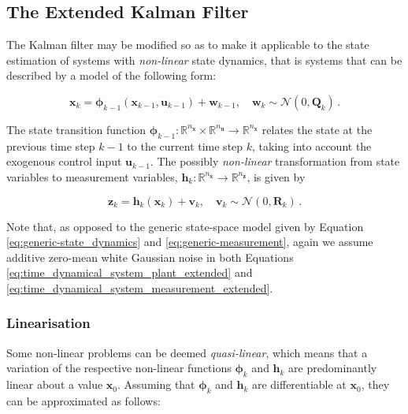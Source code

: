\subsection{The Extended Kalman Filter}\label{sec:extended_kalman}

The Kalman filter may be modified so as to make it applicable to the state estimation of systems with \emph{non-linear} state dynamics, that is systems that can be described by a model of the following form:

\begin{equation}\label{eq:time_dynamical_system_plant_extended}
  \bm{x}_k = \bm{\phi}_{k-1}(\bm{x}_{k-1}, \bm{u}_{k-1})+\bm{w}_{k-1}, \quad \bm{w}_{k} \sim \mathcal{N}(0,\bm{Q}_k)\,.
\end{equation}

\noindent
The state transition function $\bm{\phi}_{k-1}: \mathbb{R}^{n_{\bm{x}}} \times \mathbb{R}^{n_{\bm{u}}} \rightarrow \mathbb{R}^{n_{\bm{x}}}$ relates the state at the previous time step $k-1$ to the current time step $k$, taking into account the exogenous control input $\bm{u}_{k-1}$. The possibly \emph{non-linear} transformation from state variables to measurement variables, $\bm{h}_k: \mathbb{R}^{n_{\bm{x}}} \rightarrow \mathbb{R}^{n_{\bm{z}}}$, is given by

\begin{equation}\label{eq:time_dynamical_system_measurement_extended}
  \bm{z}_k = \bm{h}_{k}(\bm{x}_{k})+\bm{v}_{k}, \quad \bm{v}_{k} \sim \mathcal{N}(0,\bm{R}_k)\,.
\end{equation}

\noindent
Note that, as opposed to the generic state-space model given by Equation \ref{eq:generic-state_dynamics} and \ref{eq:generic-measurement}, again we assume additive zero-mean white Gaussian noise in both Equations \ref{eq:time_dynamical_system_plant_extended} and \ref{eq:time_dynamical_system_measurement_extended}.
 
 \subsubsection{Linearisation}
 
Some non-linear problems can be deemed \emph{quasi-linear}, which means that a variation of the respective non-linear functions $\bm{\phi}_k$ and $\bm{h}_k$ are predominantly linear about a value $\bm{x}_0$. Assuming that $\bm{\phi}_k$ and $\bm{h}_k$ are differentiable at $\bm{x}_0$, they can be approximated as follows:

